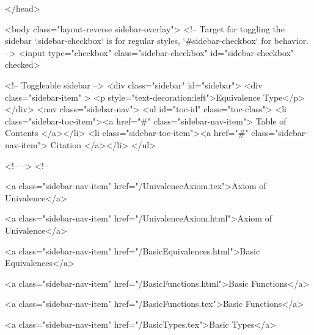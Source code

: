   
</head>




  <body class="layout-reverse sidebar-overlay">
    <!-- Target for toggling the sidebar `.sidebar-checkbox` is for regular
     styles, `#sidebar-checkbox` for behavior. -->
<input type="checkbox" class="sidebar-checkbox" id="sidebar-checkbox" checked>

<!-- Toggleable sidebar -->
<div class="sidebar" id="sidebar">
  <div class="sidebar-item" >
    <p style="text-decoration:left">Equivalence Type</p>
  </div>
  <nav class="sidebar-nav">
    <ul id="toc-id" class="toc-class">
  <li class="sidebar-toc-item"><a href="#" class="sidebar-nav-item"> Table of Contents </a></li>
  <li class="sidebar-toc-item"><a href="#" class="sidebar-nav-item"> Citation </a></li>
</ul>


    <!--  -->
    <!-- 
      
    
      
    
      
    
      
    
      
        
      
    
      
        
          <a class="sidebar-nav-item" href="/UnivalenceAxiom.tex">Axiom of Univalence</a>
        
      
    
      
        
          <a class="sidebar-nav-item" href="/UnivalenceAxiom.html">Axiom of Univalence</a>
        
      
    
      
        
          <a class="sidebar-nav-item" href="/BasicEquivalences.html">Basic Equivalences</a>
        
      
    
      
        
          <a class="sidebar-nav-item" href="/BasicFunctions.html">Basic Functions</a>
        
      
    
      
        
          <a class="sidebar-nav-item" href="/BasicFunctions.tex">Basic Functions</a>
        
      
    
      
        
          <a class="sidebar-nav-item" href="/BasicTypes.tex">Basic Types</a>
        
